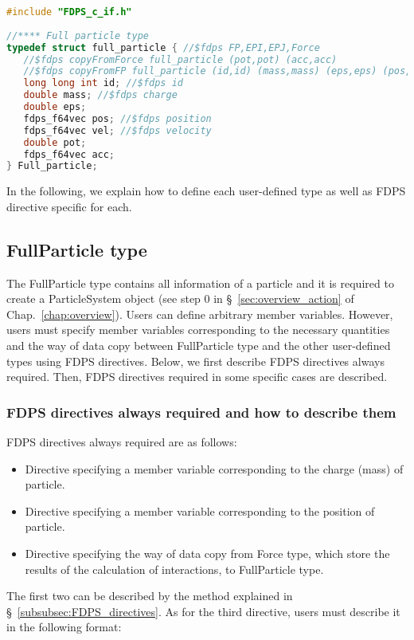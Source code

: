 \begin{lstlisting}[language=C,caption=An example of the implementation of an user-defined type (C),label=listing:FP_example_in_C]
#include "FDPS_c_if.h"
   
//**** Full particle type
typedef struct full_particle { //$fdps FP,EPI,EPJ,Force
   //$fdps copyFromForce full_particle (pot,pot) (acc,acc)
   //$fdps copyFromFP full_particle (id,id) (mass,mass) (eps,eps) (pos,pos) 
   long long int id; //$fdps id
   double mass; //$fdps charge
   double eps;
   fdps_f64vec pos; //$fdps position
   fdps_f64vec vel; //$fdps velocity
   double pot;
   fdps_f64vec acc;
} Full_particle;
\end{lstlisting}

In the following, we explain how to define each user-defined type as well as FDPS directive specific for each.

\subsection{FullParticle type}
\label{subsec:FullParticle}
The FullParticle type contains all information of a particle and it is required to create a ParticleSystem object (see step 0 in \S~\ref{sec:overview_action} of Chap.~\ref{chap:overview}). Users can define arbitrary member variables. However, users must specify member variables corresponding to the necessary quantities and the way of data copy between FullParticle type and the other user-defined types using FDPS directives. Below, we first describe FDPS directives always required. Then, FDPS directives required in some specific cases are described.
\subsubsection{FDPS directives always required and how to describe them}
\label{subsubsec:FP:FDPS_directives:always_required}
FDPS directives always required are as follows:
\begin{itemize}[leftmargin=*,itemsep=-1ex]
\item Directive specifying a member variable corresponding to the charge (mass) of particle.
\item Directive specifying a member variable corresponding to the position of particle.
\item Directive specifying the way of data copy from Force type, which store the results of the calculation of interactions, to FullParticle type.
\end{itemize}
The first two can be described by the method explained in \S~\ref{subsubsec:FDPS_directives}. As for the third directive, users must describe it in the following format:

